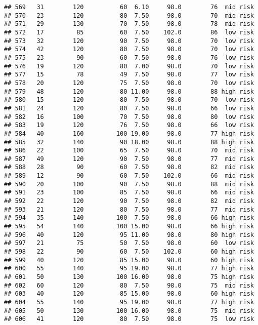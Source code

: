 \documentclass[
  ignorenonframetext,
]{beamer}
\begin{document}
\begin{frame}[fragile]
\begin{verbatim}
## 569   31        120          60  6.10     98.0        76  mid risk
## 570   23        120          80  7.50     98.0        70  mid risk
## 571   29        130          70  7.50     98.0        78  mid risk
## 572   17         85          60  7.50    102.0        86  low risk
## 573   32        120          90  7.50     98.0        70  low risk
## 574   42        120          80  7.50     98.0        70  low risk
## 575   23         90          60  7.50     98.0        76  low risk
## 576   19        120          80  7.00     98.0        70  low risk
## 577   15         78          49  7.50     98.0        77  low risk
## 578   20        120          75  7.50     98.0        70  low risk
## 579   48        120          80 11.00     98.0        88 high risk
## 580   15        120          80  7.50     98.0        70  low risk
## 581   24        120          80  7.50     98.0        66  low risk
## 582   16        100          70  7.50     98.0        80  low risk
## 583   19        120          76  7.50     98.0        66  low risk
## 584   40        160         100 19.00     98.0        77 high risk
## 585   32        140          90 18.00     98.0        88 high risk
## 586   22        100          65  7.50     98.0        70  mid risk
## 587   49        120          90  7.50     98.0        77  mid risk
## 588   28         90          60  7.50     98.0        82  mid risk
## 589   12         90          60  7.50    102.0        66  mid risk
## 590   20        100          90  7.50     98.0        88  mid risk
## 591   23        100          85  7.50     98.0        66  mid risk
## 592   22        120          90  7.50     98.0        82  mid risk
## 593   21        120          80  7.50     98.0        77  mid risk
## 594   35        140         100  7.50     98.0        66 high risk
## 595   54        140         100 15.00     98.0        66 high risk
## 596   40        120          95 11.00     98.0        80 high risk
## 597   21         75          50  7.50     98.0        60  low risk
## 598   22         90          60  7.50    102.0        60 high risk
## 599   40        120          85 15.00     98.0        60 high risk
## 600   55        140          95 19.00     98.0        77 high risk
## 601   50        130         100 16.00     98.0        75 high risk
## 602   60        120          80  7.50     98.0        75  mid risk
## 603   40        120          85 15.00     98.0        60 high risk
## 604   55        140          95 19.00     98.0        77 high risk
## 605   50        130         100 16.00     98.0        75  mid risk
## 606   41        120          80  7.50     98.0        75  low risk

\end{verbatim}
\end{frame}
\end{document}
